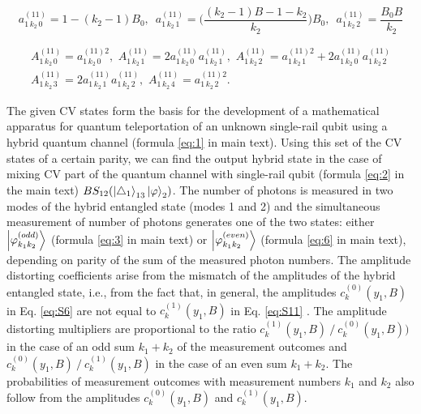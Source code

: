 \documentclass{optica-article}
\begin{document}
\begin{equation}\label{eq:S35}
a_{1\,k_2\,0}^{(11)} = 1 - (k_2-1)B_0,\,\,\,a_{1\,k_2\,1}^{(11)} = \Big(\frac{(k_2-1)B-1-k_2}{k_2}\Big)B_0,\,\,\,
a_{1\,k_2\,2}^{(11)} = \frac{B_0B}{k_2}
\tag{S35}
\end{equation}


\begin{equation}\label{eq:S36}
    \begin{array}{c}
        A^{(11)}_{1\,k_2\,0} = a^{(11)2}_{1\,k_2\,0},\,\,A^{(11)}_{1\,k_2\,1} = 2a^{(11)}_{1\,k_2\,0}a^{(11)}_{1\,k_2\,1},\,\,
        A^{(11)}_{1\,k_2\,2} = a^{(11)2}_{1\,k_2\,1}+2a^{(11)}_{1\,k_2\,0}a^{(11)}_{1\,k_2\,2}\\
        A^{(11)}_{1\,k_2\,3} = 2a^{(11)}_{1\,k_2\,1}a^{(11)}_{1\,k_2\,2},\,\,
        A^{(11)}_{1\,k_2\,4} = a^{(11)2}_{1\,k_2\,2}.
    \end{array}
\tag{S36}
\end{equation}


The given CV states form the basis for the development of a mathematical apparatus for quantum teleportation of an unknown single-rail qubit using a hybrid quantum channel (formula \eqref{eq:1}  in main text). Using this set of the CV states of a certain parity, we can find the output hybrid state in the case of mixing CV part of the quantum channel with single-rail qubit (formula \eqref{eq:2}  in the main text) $BS_{12}(\ket{\triangle_1}_{13}\ket{\varphi}_{2})$. The number of photons is measured in two modes of the hybrid entangled state (modes 1 and 2) and the simultaneous measurement of number of photons generates one of the two states: either $\ket{\varphi_{k_1k_2}^{(odd)}}$ (formula \eqref{eq:3}  in main text) or $\ket{\varphi_{k_1k_2}^{(even)}}$ (formula \eqref{eq:6}  in main text), depending on parity of the sum of the measured photon numbers. The amplitude distorting coefficients arise from the mismatch of the amplitudes of the hybrid entangled state, i.e., from the fact that, in general, the amplitudes $c_k^{(0)}(y_1,B)$ in Eq. \eqref{eq:S6}  are not equal to $c_k^{(1)}(y_1,B)$ in Eq. \eqref{eq:S11} . The amplitude distorting multipliers are proportional to the ratio $c_k^{(1)}(y_1,B)⁄c_k^{(0)}(y_1,B) )$ in the case of an odd sum $k_1+k_2$ of the measurement outcomes and $c_k^{(0)}(y_1,B)⁄c_k^{(1)}(y_1,B)$ in the case of an even sum $k_1+k_2$. The probabilities of measurement outcomes with measurement numbers $k_1$ and $k_2$ also follow from the amplitudes $c_k^{(0)}(y_1,B)$ and $c_k^{(1)}(y_1,B)$.   
\end{document}
